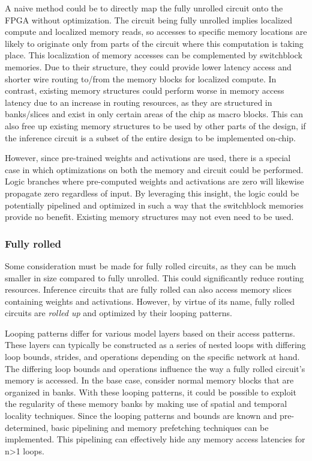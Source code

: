 A naive method could be to directly map the fully unrolled circuit onto the FPGA without optimization. 
The circuit being fully unrolled implies localized compute and localized memory reads, so accesses to specific memory locations are likely to originate only from parts of the circuit where this computation is taking place. This localization of memory accesses can be complemented by switchblock memories. 
Due to their structure, they could provide lower latency access and shorter wire routing to/from the memory blocks for localized compute. In contrast, existing memory structures could perform worse in memory access latency due to an increase in routing resources, as they are structured in banks/slices and exist in only certain areas of the chip as macro blocks. This can also free up existing memory structures to be used by other parts of the design, if the inference circuit is a subset of the entire design to be implemented on-chip.

However, since pre-trained weights and activations are used, there is a special case in which optimizations on both the memory and circuit could be performed. Logic branches where pre-computed weights and activations are zero will likewise propagate zero regardless of input. By leveraging this insight, the logic could be potentially pipelined and optimized in such a way that the switchblock memories provide no benefit. Existing memory structures may not even need to be used. 

\subsubsection{Fully rolled}
\label{context:infcircuits-fullyrolled}
Some consideration must be made for fully rolled circuits, as they can be much smaller in size compared to fully unrolled. This could significantly reduce routing resources. Inference circuits that are fully rolled can also access memory slices containing weights and activations. However, by virtue of its name, fully rolled circuits are \textit{rolled up} and optimized by their looping patterns. 

Looping patterns differ for various model layers based on their access patterns. These layers can typically be constructed as a series of nested loops with differing loop bounds, strides, and operations depending on the specific network at hand. 
The differing loop bounds and operations influence the way a fully rolled circuit's memory is accessed.
In the base case, consider normal memory blocks that are organized in banks. With these looping patterns, it could be possible to exploit the regularity of these memory banks by making use of spatial and temporal locality techniques. Since the looping patterns and bounds are known and pre-determined, basic pipelining and memory prefetching techniques can be implemented. This pipelining can effectively hide any memory access latencies for n>1 loops.

